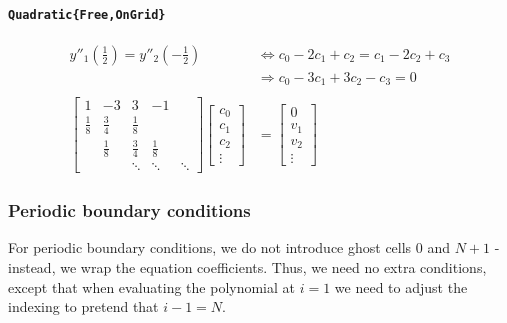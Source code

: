\documentclass{article}
\begin{document}
\paragraph{\texttt{Quadratic\{Free,OnGrid\}}}
\begin{align*}
y''_1(\frac{1}{2}) = y''_2(-\frac{1}{2}) & \Leftrightarrow c_0 - 2c_1 + c_2 = c_1 - 2c_2 + c_3 \\
&\Rightarrow c_0 - 3c_1 + 3c_2 - c_3 = 0\\
\\
\begin{bmatrix}
1 & -3 & 3 & -1 \\
\frac{1}{8} & \frac{3}{4} & \frac{1}{8} \\
 & \frac{1}{8} & \frac{3}{4} & \frac{1}{8} \\
 & & \ddots & \ddots & \ddots
\end{bmatrix}
\begin{bmatrix}c_0\\ c_1\\ c_2\\\vdots\end{bmatrix}
&=
\begin{bmatrix}0\\ v_1 \\ v_2 \\\vdots\end{bmatrix}
\end{align*}

\subsubsection{Periodic boundary conditions}

For periodic boundary conditions, we do not introduce ghost cells $0$ and $N+1$ - instead, we wrap the equation coefficients. Thus, we need no extra conditions, except that when evaluating the polynomial at $i=1$ we need to adjust the indexing to pretend that $i-1 = N$.
\end{document}
